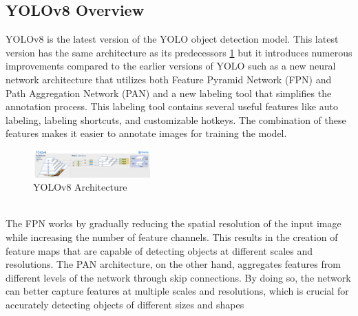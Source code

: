 \documentclass[10pt,twocolumn,letterpaper]{article}
\begin{document}
\subsection{YOLOv8 Overview}
YOLOv8 is the latest version of the YOLO object detection model. This latest version has the same architecture as its predecessors \ref{fig:YOLOv8_arch} but it introduces numerous improvements compared to the earlier versions of YOLO such as a new neural network architecture that utilizes both Feature Pyramid Network (FPN) and Path Aggregation Network (PAN) and a new labeling tool that simplifies the annotation process. This labeling tool contains several useful features like auto labeling, labeling shortcuts, and customizable hotkeys. The combination of these features makes it easier to annotate images for training the model.
\begin{figure}[h]
    \centering
    \includegraphics[width=0.4\textwidth]{figures/YOLOv8_arch.png}
    \caption{YOLOv8 Architecture ~\cite{YOLOv8Website}}
    \label{fig:YOLOv8_arch}
\end{figure}
\\
The FPN works by gradually reducing the spatial resolution of the input image while increasing the number of feature channels. This results in the creation of feature maps that are capable of detecting objects at different scales and resolutions. The PAN architecture, on the other hand, aggregates features from different levels of the network through skip connections. By doing so, the network can better capture features at multiple scales and resolutions, which is crucial for accurately detecting objects of different sizes and shapes ~\cite{CompReview}\\
\end{document}
